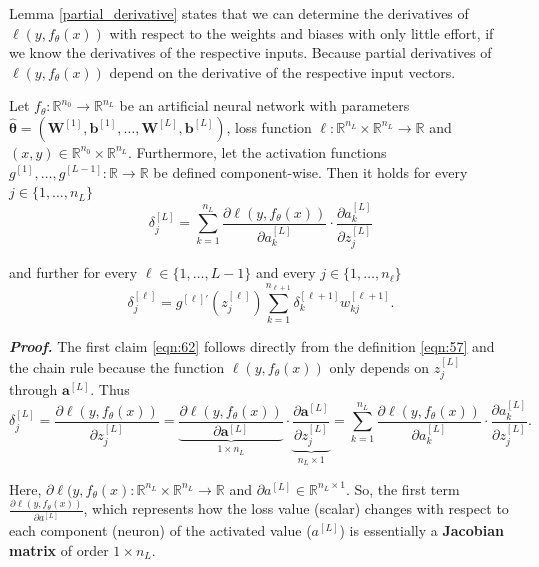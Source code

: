 Lemma \ref{partial_derivative} states that we can determine the derivatives of $\ell(y, f_{\theta}(x))$ with respect to the weights and biases with only little effort, if we know the derivatives of the respective inputs. Because partial derivatives of $\ell(y, f_\theta(x))$ depend on the derivative of the respective input vectors.

\begin{theorem}[Backpropagation]\label{backpropagation}
Let $f_{\theta}: \mathbb{R}^{n_0} \rightarrow \mathbb{R}^{n_L}$ be an artificial neural network with parameters $\hat{\boldsymbol{\theta}} = (\boldsymbol{W}^{[1]}, \boldsymbol{b}^{[1]}, \ldots, \boldsymbol{W}^{[L]}, \boldsymbol{b}^{[L]})$, loss function $\ell: \mathbb{R}^{n_L} \times \mathbb{R}^{n_L} \rightarrow \mathbb{R}$ and $(x, y) \in \mathbb{R}^{n_0} \times \mathbb{R}^{n_L}$. Furthermore, let the activation functions $g^{[1]}, \ldots, g^{[L-1]}: \mathbb{R} \rightarrow \mathbb{R}$ be defined component-wise. Then it holds for every $j \in \{1, \ldots, n_L\}$
\begin{equation}
    \delta_j^{[L]} = \sum_{k=1}^{n_L} \frac{\partial \ell(y, f_\theta(x))}{\partial a_k^{[L]}} \cdot \frac{\partial a_k^{[L]}}{\partial z_j^{[L]}}
    \label{eqn:62}
\end{equation}

and further for every $\ell \in \{1, \ldots, L-1\}$ and every $j \in \{1, \ldots, n_{\ell}\}$
\begin{equation}
    \delta_j^{[\ell]} = g^{[\ell]'}(z_j^{[\ell]}) \sum_{k=1}^{n_{\ell+1}} \delta_k^{[\ell+1]} w_{kj}^{[\ell+1]}.
    \label{eqn:63}
\end{equation}
\end{theorem}

\textbf{\emph{Proof.}} The first claim \ref{eqn:62} follows directly from the definition \ref{eqn:57} and the chain rule because the function $\ell(y, f_{\theta}(x))$ only depends on $z_j^{[L]}$ through $\boldsymbol{a}^{[L]}$. Thus
\begin{equation}
    \delta_j^{[L]} = \frac{\partial \ell(y, f_\theta(x))}{\partial z_j^{[L]}} = \underbrace{\frac{\partial \ell(y, f_\theta(x))}{\partial \boldsymbol{a}^{[L]}}}_{1 \times n_L} \cdot \underbrace{\frac{\partial \boldsymbol{a}^{[L]}}{\partial z_j^{[L]}}}_{n_L \times 1} = \sum_{k=1}^{n_L} \frac{\partial \ell(y, f_\theta(x))}{\partial a_k^{[L]}} \cdot \frac{\partial a_k^{[L]}}{\partial z_j^{[L]}}.
    \label{eqn:64}
\end{equation}

Here, $\partial \ell(y, f_\theta(x): \mathbb{R}^{n_L} \times \mathbb{R}^{n_L} \rightarrow \mathbb{R}$ and $\partial a^{[L]} \in \mathbb{R}^{n_L \times 1}$. So, the first term $\frac{\partial \ell(y, f_\theta(x))}{\partial a^{[L]}}$, which represents how the loss value (scalar) changes with respect to each component (neuron) of the activated value ($a^{[L]}$) is essentially a \textbf{Jacobian matrix} of order $1 \times n_L$.\\

